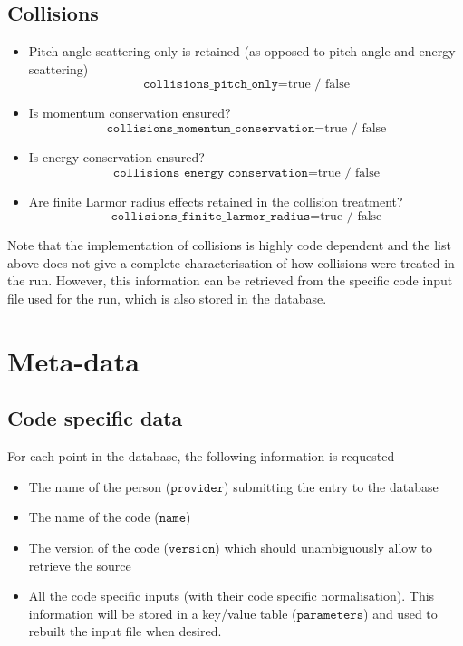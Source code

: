 \documentclass[a4paper]{report}
\begin{document}
\subsection{Collisions} \label{sec:colswitches}
\begin{itemize}
	\item Pitch angle scattering only is retained (as opposed to pitch angle and energy scattering)
	$$\texttt{collisions\_pitch\_only}= \textrm{true / false}$$ 
	\item Is momentum conservation ensured?
	$$\texttt{collisions\_momentum\_conservation}= \textrm{true / false}$$ 
	\item Is energy conservation ensured?
	$$\texttt{collisions\_energy\_conservation}= \textrm{true / false}$$ 
	\item Are finite Larmor radius effects retained in the collision treatment?
	$$\texttt{collisions\_finite\_larmor\_radius}= \textrm{true / false}$$ 
\end{itemize}
Note that the implementation of collisions is highly code dependent and the list above does not give a complete characterisation of how collisions were treated in the run. However, this information can be retrieved from the specific code input file used for the run, which is also stored in the database.\\



\section{Meta-data}

\subsection{Code specific data} \label{sec:codespecfic}
For each point in the database, the following information is requested
\begin{itemize}
 \item The name of the person ($\texttt{provider}$) submitting the entry to the database
 \item The name of the code ($\texttt{name}$)
 \item The version of the code ($\texttt{version}$) which should unambiguously allow to retrieve the source 
 \item All the code specific inputs (with their code specific normalisation). This information will be stored in a key/value table ($\texttt{parameters}$) and used to rebuilt the input file when desired.
\end{itemize}
\end{document}
